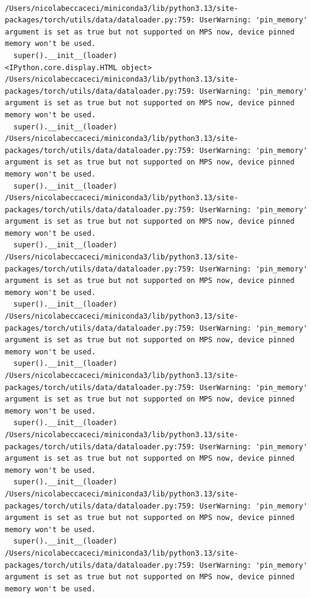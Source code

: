 \documentclass[../labs.tex]{subfiles}
\begin{document}
\hypertarget{out:lab03-bert-c33}{}\label{out:lab03-bert-c33}

\begin{lstlisting}[style=terminalOutput,breakatwhitespace=false,columns=fullflexible]

/Users/nicolabeccaceci/miniconda3/lib/python3.13/site-packages/torch/utils/data/dataloader.py:759: UserWarning: 'pin_memory' argument is set as true but not supported on MPS now, device pinned memory won't be used.
  super().__init__(loader)
<IPython.core.display.HTML object>
/Users/nicolabeccaceci/miniconda3/lib/python3.13/site-packages/torch/utils/data/dataloader.py:759: UserWarning: 'pin_memory' argument is set as true but not supported on MPS now, device pinned memory won't be used.
  super().__init__(loader)
/Users/nicolabeccaceci/miniconda3/lib/python3.13/site-packages/torch/utils/data/dataloader.py:759: UserWarning: 'pin_memory' argument is set as true but not supported on MPS now, device pinned memory won't be used.
  super().__init__(loader)
/Users/nicolabeccaceci/miniconda3/lib/python3.13/site-packages/torch/utils/data/dataloader.py:759: UserWarning: 'pin_memory' argument is set as true but not supported on MPS now, device pinned memory won't be used.
  super().__init__(loader)
/Users/nicolabeccaceci/miniconda3/lib/python3.13/site-packages/torch/utils/data/dataloader.py:759: UserWarning: 'pin_memory' argument is set as true but not supported on MPS now, device pinned memory won't be used.
  super().__init__(loader)
/Users/nicolabeccaceci/miniconda3/lib/python3.13/site-packages/torch/utils/data/dataloader.py:759: UserWarning: 'pin_memory' argument is set as true but not supported on MPS now, device pinned memory won't be used.
  super().__init__(loader)
/Users/nicolabeccaceci/miniconda3/lib/python3.13/site-packages/torch/utils/data/dataloader.py:759: UserWarning: 'pin_memory' argument is set as true but not supported on MPS now, device pinned memory won't be used.
  super().__init__(loader)
/Users/nicolabeccaceci/miniconda3/lib/python3.13/site-packages/torch/utils/data/dataloader.py:759: UserWarning: 'pin_memory' argument is set as true but not supported on MPS now, device pinned memory won't be used.
  super().__init__(loader)
/Users/nicolabeccaceci/miniconda3/lib/python3.13/site-packages/torch/utils/data/dataloader.py:759: UserWarning: 'pin_memory' argument is set as true but not supported on MPS now, device pinned memory won't be used.
  super().__init__(loader)
/Users/nicolabeccaceci/miniconda3/lib/python3.13/site-packages/torch/utils/data/dataloader.py:759: UserWarning: 'pin_memory' argument is set as true but not supported on MPS now, device pinned memory won't be used.

\end{lstlisting}
\end{document}
